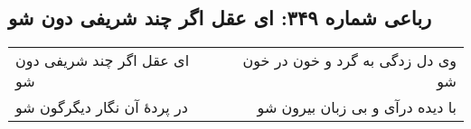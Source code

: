 \begin{center}
\section*{رباعی شماره ۳۴۹: ای عقل اگر چند شریفی دون شو}
\label{sec:sh349}
\begin{longtable}{l p{0.5cm} r}
ای عقل اگر چند شریفی دون شو
&&
وی دل زدگی به گرد و خون در خون شو
\\
در پردهٔ آن نگار دیگرگون شو
&&
با دیده درآی و بی زبان بیرون شو
\\
\end{longtable}
\end{center}
